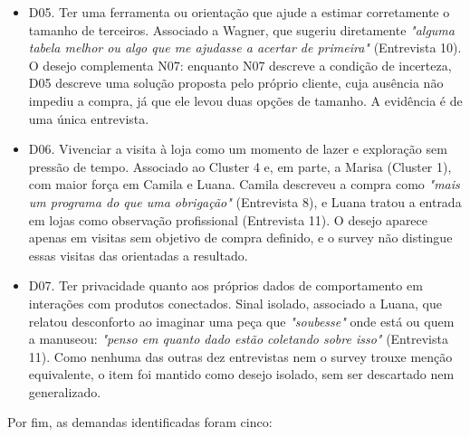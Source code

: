 \begin{itemize}
    \item D05. Ter uma ferramenta ou orientação que ajude a estimar corretamente o tamanho de terceiros. Associado a Wagner, que sugeriu diretamente \emph{"alguma tabela melhor ou algo que me ajudasse a acertar de primeira"} (Entrevista 10). O desejo complementa N07: enquanto N07 descreve a condição de incerteza, D05 descreve uma solução proposta pelo próprio cliente, cuja ausência não impediu a compra, já que ele levou duas opções de tamanho. A evidência é de uma única entrevista.

    \item D06. Vivenciar a visita à loja como um momento de lazer e exploração sem pressão de tempo. Associado ao Cluster 4 e, em parte, a Marisa (Cluster 1), com maior força em Camila e Luana. Camila descreveu a compra como \emph{"mais um programa do que uma obrigação"} (Entrevista 8), e Luana tratou a entrada em lojas como observação profissional (Entrevista 11). O desejo aparece apenas em visitas sem objetivo de compra definido, e o survey não distingue essas visitas das orientadas a resultado.

    \item D07. Ter privacidade quanto aos próprios dados de comportamento em interações com produtos conectados. Sinal isolado, associado a Luana, que relatou desconforto ao imaginar uma peça que \emph{"soubesse"} onde está ou quem a manuseou: \emph{"penso em quanto dado estão coletando sobre isso"} (Entrevista 11). Como nenhuma das outras dez entrevistas nem o survey trouxe menção equivalente, o item foi mantido como desejo isolado, sem ser descartado nem generalizado.
\end{itemize}

Por fim, as demandas identificadas foram cinco:

